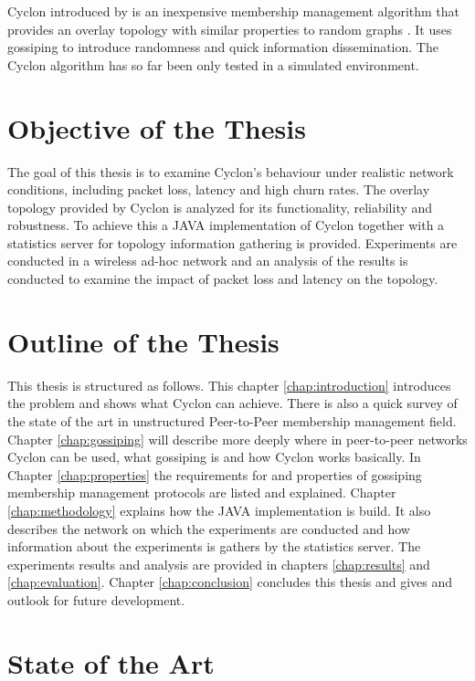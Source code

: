 Cyclon introduced by \cite{voulgaris2005cyclon} is an inexpensive membership
management algorithm that provides an overlay topology with similar properties
to random graphs \cite{Bollobas1985}. It uses gossiping to introduce randomness
and quick information dissemination. The Cyclon algorithm has so far been only
tested in a simulated environment.

\section{Objective of the Thesis} 
The goal of this thesis is to examine Cyclon's behaviour under realistic
network conditions, including packet loss, latency and high churn rates. The
overlay topology provided by Cyclon is analyzed for its functionality,
reliability and robustness. To achieve this a JAVA implementation of Cyclon
together with a statistics server for topology information gathering is
provided. Experiments are conducted in a wireless ad-hoc network and an
analysis of the results is conducted to examine the impact of packet loss and
latency on the topology. 

 \section{Outline of the Thesis} %
This thesis is structured as follows. This chapter \ref{chap:introduction}
introduces the problem and shows what Cyclon can achieve. There is also a quick
survey of the state of the art in unstructured Peer-to-Peer membership
management field. Chapter \ref{chap:gossiping} will describe more deeply where
in peer-to-peer networks Cyclon can be used, what gossiping is and how Cyclon
works basically. In Chapter \ref{chap:properties} the requirements for and
properties of gossiping membership management protocols are listed and
explained. Chapter \ref{chap:methodology} explains how the JAVA implementation
is build. It also describes the network on which the experiments are conducted
and how information about the experiments is gathers by the statistics server.
The experiments results and analysis are provided in chapters \ref{chap:results}
and \ref{chap:evaluation}. Chapter \ref{chap:conclusion} concludes this thesis
and gives and outlook for future development.

\section{State of the Art}

